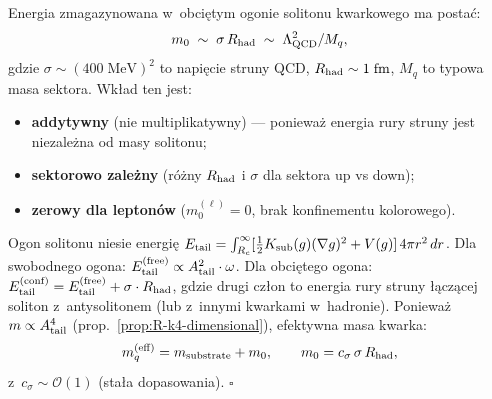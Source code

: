 \begin{propozycja}%
\label{prop:X-confinement-mass}

Energia zmagazynowana w~obci\k{e}tym ogonie solitonu
kwarkowego ma posta\'c:
\begin{equation}\label{eq:X-m0-estimate}
  m_0 \;\sim\; \sigma\,R_{\rm had}
  \;\sim\; \Lambda_{\rm QCD}^2 / M_q,
\end{equation}
gdzie $\sigma \sim (400\;\text{MeV})^2$ to napięcie struny QCD,
$R_{\rm had} \sim 1\;\text{fm}$, $M_q$ to typowa masa sektora.
Wk\l{}ad ten jest:
\begin{itemize}[nosep]
  \item \textbf{addytywny} (nie multiplikatywny) ---
        poniewa\.z energia rury struny jest niezale\.zna
        od masy solitonu;
  \item \textbf{sektorowo zale\.zny} (r\'o\.zny $R_{\rm had}$
        i $\sigma$ dla sektora up vs down);
  \item \textbf{zerowy dla lepton\'ow} ($m_0^{(\ell)} = 0$,
        brak konfinementu kolorowego).
\end{itemize}
\end{propozycja}

\begin{dowod}[szkic]
Ogon solitonu niesie energi\k{e}
$E_{\rm tail} = \int_{R_c}^{\infty} [\frac{1}{2}K_{\rm sub}(g)(\nabla g)^2
+ V(g)] \, 4\pi r^2\,dr$.
Dla swobodnego ogona: $E_{\rm tail}^{(\rm free)} \propto A_{\rm tail}^2
\cdot \omega$.
Dla obci\k{e}tego ogona: $E_{\rm tail}^{(\rm conf)} =
E_{\rm tail}^{(\rm free)} + \sigma \cdot R_{\rm had}$,
gdzie drugi cz\l{}on to energia rury struny \l{}\k{a}cz\k{a}cej
soliton z~antysolitonem (lub z~innymi kwarkami w~hadronie).
Poniewa\.z $m \propto A_{\rm tail}^4$ (prop.~\ref{prop:R-k4-dimensional}),
efektywna masa kwarka:
\begin{equation}
  m_q^{(\rm eff)} = m_{\rm substrate} + m_0,
  \qquad m_0 = c_\sigma\,\sigma\,R_{\rm had},
\end{equation}
z~$c_\sigma \sim \mathcal{O}(1)$ (sta\l{}a dopasowania).
\hfill$\square$
\end{dowod}

